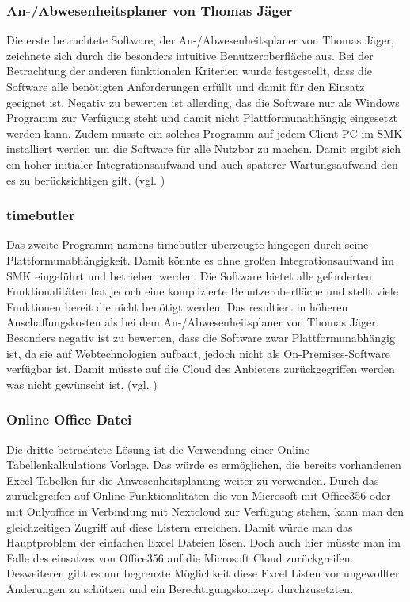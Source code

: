 \subsubsection{An-/Abwesenheitsplaner von Thomas Jäger}
\label{sec:AnAbwesenheitsplaner}
Die erste betrachtete Software, der An-/Abwesenheitsplaner von Thomas Jäger, zeichnete sich durch die besonders intuitive Benutzeroberfläche aus. Bei der Betrachtung der anderen funktionalen Kriterien wurde festgestellt, dass die Software alle benötigten Anforderungen erfüllt und damit für den Einsatz geeignet ist. Negativ zu bewerten ist allerding, das die Software nur als Windows Programm zur Verfügung steht und damit nicht Plattformunabhängig eingesetzt werden kann. Zudem müsste ein solches Programm auf jedem Client PC im SMK installiert werden um die Software für alle Nutzbar zu machen. Damit ergibt sich ein hoher initialer Integrationsaufwand und auch späterer Wartungsaufwand den es zu berücksichtigen gilt. (vgl. \cite{AnAbwesenPlaner})


\subsubsection{timebutler}
\label{sec:timebutler}
Das zweite Programm namens timebutler überzeugte hingegen durch seine Plattformunabhängigkeit. Damit könnte es ohne großen Integrationsaufwand im SMK eingeführt und betrieben werden. Die Software bietet alle geforderten Funktionalitäten hat jedoch eine komplizierte Benutzeroberfläche und stellt viele Funktionen bereit die nicht benötigt werden. Das resultiert in höheren Anschaffungskosten als bei dem An-/Abwesenheitsplaner von Thomas Jäger. Besonders negativ ist zu bewerten, dass die Software zwar Plattformunabhängig ist, da sie auf Webtechnologien aufbaut, jedoch nicht als On-Premises-Software verfügbar ist. Damit müsste auf die Cloud des Anbieters zurückgegriffen werden was nicht gewünscht ist. (vgl. \cite{timebutler})

\subsubsection{Online Office Datei}
\label{sec:OnlineOffice}
Die dritte betrachtete Lösung ist die Verwendung einer Online Tabellenkalkulations Vorlage. Das würde es ermöglichen, die bereits vorhandenen Excel Tabellen für die Anwesenheitsplanung weiter zu verwenden. Durch das zurückgreifen auf Online Funktionalitäten die \zB von Microsoft mit Office356 oder mit Onlyoffice in Verbindung mit Nextcloud zur Verfügung stehen, kann man den gleichzeitigen Zugriff auf diese Listern erreichen. Damit würde man das Hauptproblem der einfachen Excel Dateien lösen. Doch auch hier müsste man im Falle des einsatzes von Office356 auf die Microsoft Cloud zurückgreifen. Desweiteren gibt es nur begrenzte Möglichkeit diese Excel Listen vor ungewollter Änderungen zu schützen und ein Berechtigungskonzept durchzusetzten.

